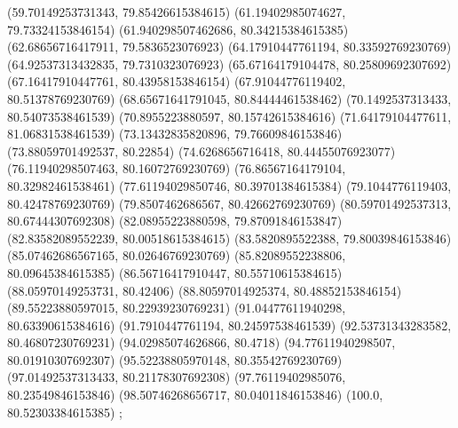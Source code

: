 {{{		(59.70149253731343, 79.85426615384615)
		(61.19402985074627, 79.73324153846154)
		(61.940298507462686, 80.34215384615385)
		(62.68656716417911, 79.5836523076923)
		(64.17910447761194, 80.33592769230769)
		(64.92537313432835, 79.7310323076923)
		(65.67164179104478, 80.25809692307692)
		(67.16417910447761, 80.43958153846154)
		(67.91044776119402, 80.51378769230769)
		(68.65671641791045, 80.84444461538462)
		(70.1492537313433, 80.54073538461539)
		(70.8955223880597, 80.15742615384616)
		(71.64179104477611, 81.06831538461539)
		(73.13432835820896, 79.76609846153846)
		(73.88059701492537, 80.22854)
		(74.6268656716418, 80.44455076923077)
		(76.11940298507463, 80.16072769230769)
		(76.86567164179104, 80.32982461538461)
		(77.61194029850746, 80.39701384615384)
		(79.1044776119403, 80.42478769230769)
		(79.8507462686567, 80.42662769230769)
		(80.59701492537313, 80.67444307692308)
		(82.08955223880598, 79.87091846153847)
		(82.83582089552239, 80.00518615384615)
		(83.5820895522388, 79.80039846153846)
		(85.07462686567165, 80.02646769230769)
		(85.82089552238806, 80.09645384615385)
		(86.56716417910447, 80.55710615384615)
		(88.05970149253731, 80.42406)
		(88.80597014925374, 80.48852153846154)
		(89.55223880597015, 80.22939230769231)
		(91.04477611940298, 80.63390615384616)
		(91.7910447761194, 80.24597538461539)
		(92.53731343283582, 80.46807230769231)
		(94.02985074626866, 80.4718)
		(94.77611940298507, 80.01910307692307)
		(95.52238805970148, 80.35542769230769)
		(97.01492537313433, 80.21178307692308)
		(97.76119402985076, 80.23549846153846)
		(98.50746268656717, 80.04011846153846)
		(100.0, 80.52303384615385)
	};

}}
